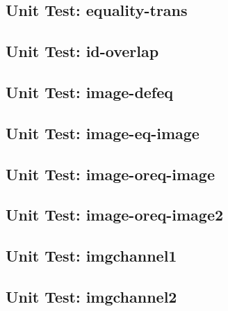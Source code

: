 \subsection*{Unit Test: equality-trans}

 \clearpage
\subsection*{Unit Test: id-overlap}

 \clearpage
\subsection*{Unit Test: image-defeq}

 \clearpage
\subsection*{Unit Test: image-eq-image}

 \clearpage
\subsection*{Unit Test: image-oreq-image}

 \clearpage
\subsection*{Unit Test: image-oreq-image2}

 \clearpage
\subsection*{Unit Test: imgchannel1}

 \clearpage
\subsection*{Unit Test: imgchannel2}

 \clearpage
